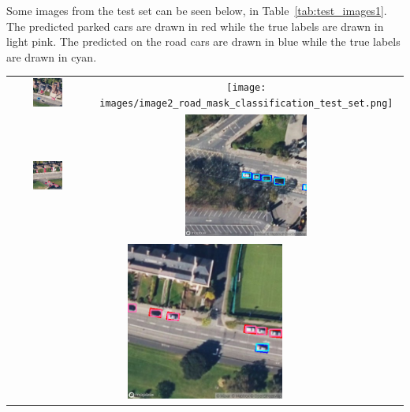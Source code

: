 Some images from the test set can be seen below, in Table~\ref{tab:test_images1}.
The predicted parked cars are drawn in red while the true labels are drawn in light pink. The predicted on the road cars are drawn in blue while the true labels are drawn in cyan.

\begin{table}[htbp]
  \centering
  \begin{tabular}{cc}
    \includegraphics[width=0.4\textwidth]{images/image1_road_mask_classification_test_set.png} & \texttt{[image: images/image2\_road\_mask\_classification\_test\_set.png]} \\
    \includegraphics[width=0.4\textwidth]{images/image3_road_mask_classification_test_set.png} & \includegraphics[width=0.4\textwidth]{images/image4_road_mask_classification_test_set.png} \\
    \multicolumn{2}{c}{\includegraphics[width=0.4\textwidth]{images/image5_road_mask_classification_test_set.png}}                                                                          \\

\end{tabular}
\end{table}
